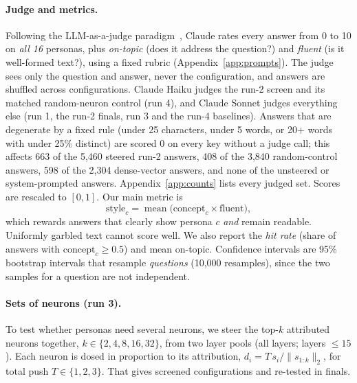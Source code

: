 \documentclass[11pt]{article}
\newcommand{\dose}{d}
\begin{document}
\paragraph{Judge and metrics.} Following the LLM-as-a-judge paradigm~\citep{zheng2023judging}, Claude rates every answer from 0 to 10 on \emph{all 16} personas, plus \emph{on-topic} (does it address the question?) and \emph{fluent} (is it well-formed text?), using a fixed rubric (Appendix~\ref{app:prompts}). The judge sees only the question and answer, never the configuration, and answers are shuffled across configurations. Claude Haiku judges the run-2 screen and its matched random-neuron control (run 4), and Claude Sonnet judges everything else (run 1, the run-2 finals, run 3 and the run-4 baselines). Answers that are degenerate by a fixed rule (under 25 characters, under 5 words, or 20+ words with under 25\% distinct) are scored 0 on every key without a judge call; this affects 663 of the 5,460 steered run-2 answers, 408 of the 3,840 random-control answers, 598 of the 2,304 dense-vector answers, and none of the unsteered or system-prompted answers. Appendix~\ref{app:counts} lists every judged set. Scores are rescaled to $[0,1]$. Our main metric is
\[
\text{style}_c = \operatorname{mean}\big(\text{concept}_c \times \text{fluent}\big),
\]
which rewards answers that clearly show persona $c$ \emph{and} remain readable. Uniformly garbled text cannot score well. We also report the \emph{hit rate} (share of answers with $\text{concept}_c \ge 0.5$) and mean on-topic. Confidence intervals are 95\% bootstrap intervals that resample \emph{questions} (10,000 resamples), since the two samples for a question are not independent.

\paragraph{Sets of neurons (run 3).} To test whether personas need several neurons, we steer the top-$k$ attributed neurons together, $k\in\{2,4,8,16,32\}$, from two layer pools (all layers; layers $\le 15$). Each neuron is dosed in proportion to its attribution, $\dose_i = T\,s_i/\lVert s_{1:k}\rVert_2$, for total push $T\in\{1,2,3\}$. That gives \nSetScreen{} screened configurations and \nSetFinals{} re-tested in finals.
\end{document}
